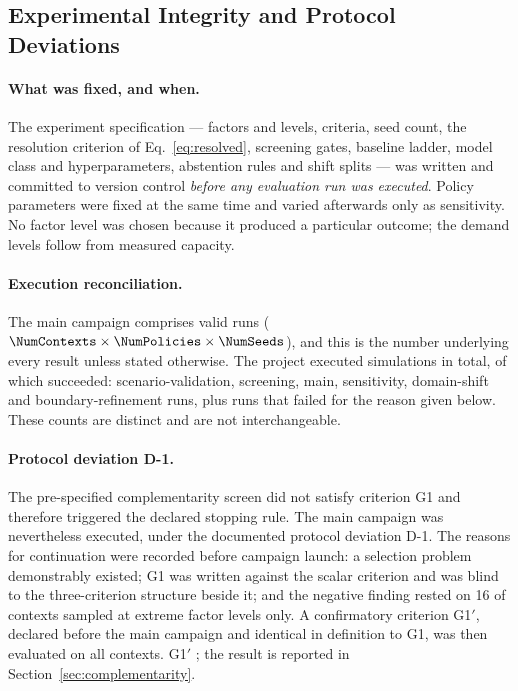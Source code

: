 \subsection{Experimental Integrity and Protocol Deviations}
\label{sec:integrity}

\paragraph{What was fixed, and when.} The experiment specification --- factors
and levels, criteria, seed count, the resolution criterion of
Eq.~\ref{eq:resolved}, screening gates, baseline ladder, model class and
hyperparameters, abstention rules and shift splits --- was written and committed
to version control \emph{before any evaluation run was executed}. Policy
parameters were fixed at the same time and varied afterwards only as
sensitivity. No factor level was chosen because it produced a particular
outcome; the demand levels follow from measured capacity.

\paragraph{Execution reconciliation.} The main campaign comprises
\NumRunsMain{} valid runs
($\NumContexts \times \NumPolicies \times \NumSeeds$), and this is the number
underlying every result unless stated otherwise. The project executed
\NumRunsTotalAttempted{} simulations in total, of which
\NumRunsTotalSucceeded{} succeeded: \NumRunsValidate{} scenario-validation,
\NumRunsScreen{} screening, \NumRunsMain{} main, \NumRunsSens{} sensitivity,
\NumRunsOODNorth{} domain-shift and \NumRunsBoundary{} boundary-refinement runs,
plus \NumRunsFailedBypass{} runs that failed for the reason given below. These
counts are distinct and are not interchangeable.

\paragraph{Protocol deviation D-1.} The pre-specified complementarity screen did
not satisfy criterion G1 and therefore triggered the declared stopping rule. The
main campaign was nevertheless executed, under the documented protocol deviation
D-1. The reasons for continuation were recorded before campaign launch: a
selection problem demonstrably existed; G1 was written against the scalar
criterion and was blind to the three-criterion structure beside it; and the
negative finding rested on 16 of \NumContexts{} contexts sampled at extreme
factor levels only. A confirmatory criterion G1$'$, declared before the main
campaign and identical in definition to G1, was then evaluated on all
\NumContexts{} contexts. G1$'$ \NumGOneVerdict{}; the result is reported in
Section~\ref{sec:complementarity}.

